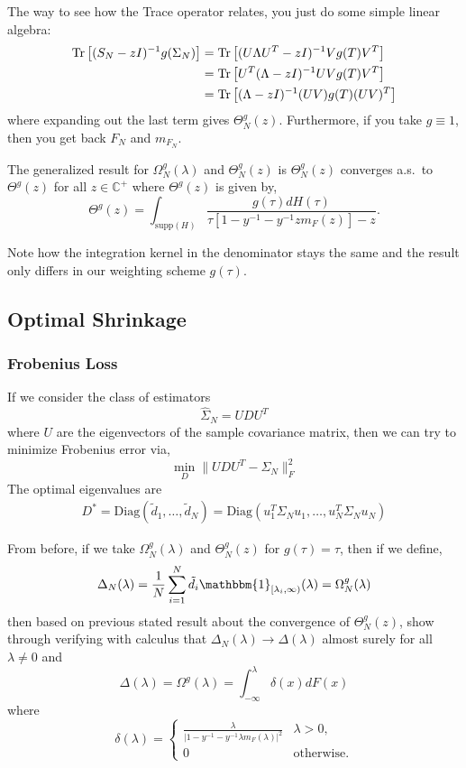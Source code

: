 \documentclass{article}
\begin{document}
The way to see how the Trace operator relates, you just do some simple linear
algebra:
\begin{align*}
	\mathrm{Tr}\left[(S_N - zI)^{-1} g(\Sigma_N)\right]
		& = \mathrm{Tr}\left[( U\Lambda U^T - zI)^{-1} V g(T) V^T \right] \\
		& = \mathrm{Tr}\left[U^T(\Lambda - zI)^{-1} UV g(T) V^T \right] \\
		& = \mathrm{Tr}\left[(\Lambda - zI)^{-1} (UV) g(T) (UV)^T \right]
\end{align*}
where expanding out the last term gives $\Theta^g_N(z)$.  Furthermore, if you
take $g \equiv 1$, then you get back $F_N$ and $m_{F_N}$.

The generalized result for $\Omega^g_N(\lambda)$ and $\Theta^g_N(z)$ is $\Theta^g_N(z)$
converges a.s.\ to $\Theta^g(z)$ for all $z \in \mathbb{C}^+$ where $\Theta^g(z)$ 
is given by,
$$
	\Theta^g(z) = \int_{\mathrm{supp}(H)}
			 \frac{g(\tau)dH(\tau)}{\tau\left[1 - y^{-1} - y^{-1}z m_F(z) \right] - z}.
$$

Note how the integration kernel in the denominator stays the same and the result
only differs in our weighting scheme $g(\tau)$.

\subsection{Optimal Shrinkage}

\subsubsection{Frobenius Loss}\label{sec:fro_loss}

If we consider the class of estimators
$$
	\hat{\Sigma}_N = U D U^T
$$
where $U$ are the eigenvectors of the sample covariance matrix, then we can try
to minimize Frobenius error via,
$$
	\min_D \| UDU^T - \Sigma_N\|_F^2
$$
The optimal eigenvalues are
\begin{align}\label{eq:fro_oracle}
	D^* = \mathrm{Diag}(\tilde{d}_1, \ldots, \tilde{d}_N)
		  = \mathrm{Diag}(u_1^T \Sigma_N u_1, \ldots, u_N^T\Sigma_N u_N)
\end{align}

From before, if we take $\Omega^g_N(\lambda)$ and $\Theta^g_N(z)$ for $g(\tau) =
\tau$, then if we define,
$$
	\Delta_N(\lambda)
		 = \frac1N \sum_{i=1}^N 
		 			\tilde{d}_i \mathbbm{1}_{[\lambda_i, \infty)}(\lambda)
		 = \Omega^g_N(\lambda)
$$
then based on previous stated result about the convergence of $\Theta^g_N(z)$,
\cite{Ledoit2011Eigenvectors} show through verifying with calculus that
$\Delta_N(\lambda) \rightarrow \Delta(\lambda)$ almost surely for all $\lambda
\ne 0$ and
$$
	\Delta(\lambda) = \Omega^g(\lambda) = \int_{-\infty}^\lambda \delta(x)dF(x)
$$
where 
$$
	\delta(\lambda) = 
		\begin{cases}
			\frac{\lambda}{|1 - y^{-1} - y^{-1}\lambda m_F(\lambda)|^2} & \lambda > 0,\\
			0 & \text{otherwise.}
		\end{cases}
$$
\end{document}
